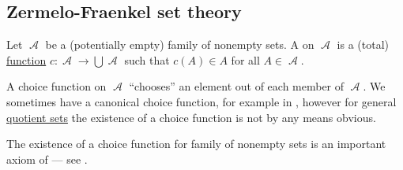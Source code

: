 \subsection{Zermelo-Fraenkel set theory}\label{subsec:zermelo_fraenkel_set_theory}

\begin{definition}\label{def:choice_function}
  Let \( \mscrA \) be a (potentially empty) family of nonempty sets. A  on \( \mscrA \) is a (total) \hyperref[def:function]{function} \( c: \mscrA \to \bigcup \mscrA \) such that \( c(A) \in A \) for all \( A \in \mscrA \).

  A choice function on \( \mscrA \) \enquote{chooses} an element out of each member of \( \mscrA \). We sometimes have a canonical choice function, for example in , however for general \hyperref[def:equivalence_relation/quotient]{quotient sets} the existence of a choice function is not by any means obvious.

  The existence of a choice function for family of nonempty sets is an important axiom of  --- see .
\end{definition}

